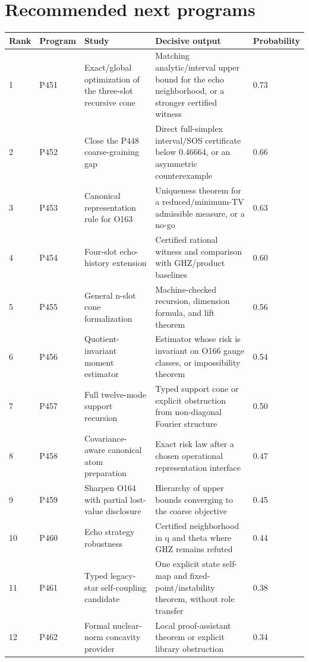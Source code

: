 \documentclass[11pt,a4paper,openany]{report}
\begin{document}
\chapter{Recommended next programs}

\begin{center}
\begingroup\fontsize{7}{8.4}\selectfont
\setlength{\tabcolsep}{2.5pt}
\renewcommand{\arraystretch}{1.16}
\begin{longtable}{@{}p{}p{}p{}p{}p{}@{}}
\toprule
\textbf{Rank} & \textbf{Program} & \textbf{Study} & \textbf{Decisive output} & \textbf{Probability} \\
\midrule
\endhead
1 & P451 & Exact/\allowbreak{}global optimization of the three-slot recursive cone & Matching analytic/\allowbreak{}interval upper bound for the echo neighborhood, or a stronger certified witness & 0.73 \\
2 & P452 & Close the P448 coarse-graining gap & Direct full-simplex interval/\allowbreak{}SOS certificate below 0.46664, or an asymmetric counterexample & 0.66 \\
3 & P453 & Canonical representation rule for O163 & Uniqueness theorem for a reduced/\allowbreak{}minimum-TV admissible measure, or a no-go & 0.63 \\
4 & P454 & Four-slot echo-history extension & Certified rational witness and comparison with GHZ/\allowbreak{}product baselines & 0.60 \\
5 & P455 & General n-slot cone formalization & Machine-checked recursion, dimension formula, and lift theorem & 0.56 \\
6 & P456 & Quotient-invariant moment estimator & Estimator whose risk is invariant on O166 gauge classes, or impossibility theorem & 0.54 \\
7 & P457 & Full twelve-mode support recursion & Typed support cone or explicit obstruction from non-diagonal Fourier structure & 0.50 \\
8 & P458 & Covariance-aware canonical atom preparation & Exact risk law after a chosen operational representation interface & 0.47 \\
9 & P459 & Sharpen O164 with partial lost-value disclosure & Hierarchy of upper bounds converging to the coarse objective & 0.45 \\
10 & P460 & Echo strategy robustness & Certified neighborhood in q and theta where GHZ remains refuted & 0.44 \\
11 & P461 & Typed legacy-star self-coupling candidate & One explicit state self-map and fixed-point/\allowbreak{}instability theorem, without role transfer & 0.38 \\
12 & P462 & Formal nuclear-norm concavity provider & Local proof-assistant theorem or explicit library obstruction & 0.34 \\
\bottomrule
\end{longtable}
\endgroup
\end{center}
\end{document}
